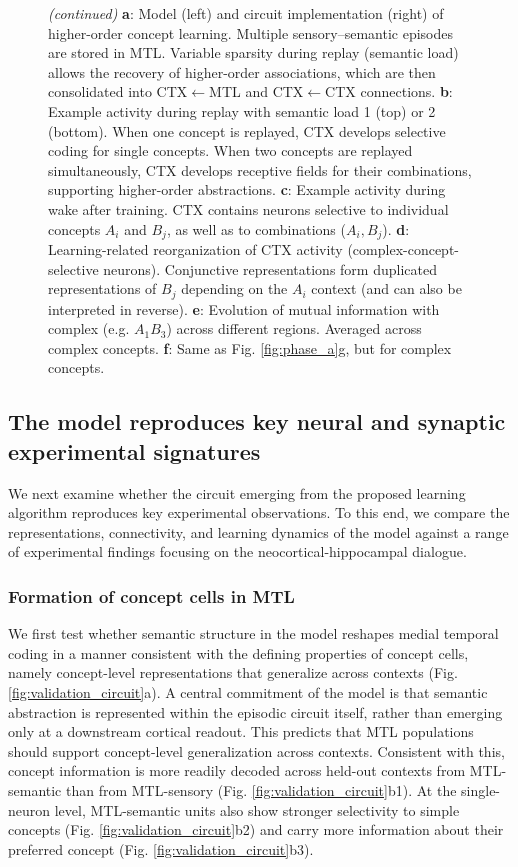 \documentclass{article}
\begin{document}
\begin{figure}[h!]
  \ContinuedFloat
  \captionsetup{list=off} %
  \caption{\textit{(continued)} \textbf{a}: Model (left) and circuit implementation (right) of higher-order concept learning. Multiple sensory--semantic episodes are stored in MTL. Variable sparsity during replay (semantic load) allows the recovery of higher-order associations, which are then consolidated into CTX$\leftarrow$MTL and CTX$\leftarrow$CTX connections. \textbf{b}: Example activity during replay with semantic load 1 (top) or 2 (bottom). When one concept is replayed, CTX develops selective coding for single concepts. When two concepts are replayed simultaneously, CTX develops receptive fields for their combinations, supporting higher-order abstractions.  
\textbf{c}: Example activity during wake after training. CTX contains neurons selective to individual concepts $A_i$ and $B_j$, as well as to combinations ($A_i, B_j$).  
\textbf{d}: Learning-related reorganization of CTX activity (complex-concept-selective neurons). Conjunctive representations form duplicated representations of $B_j$ depending on the $A_i$ context (and can also be interpreted in reverse).
\textbf{e}: Evolution of mutual information with complex (e.g. $A_1B_3$) across different regions. Averaged across  complex concepts. \textbf{f}: Same as Fig. \ref{fig:phase_a}g, but for complex concepts.}
\end{figure}
\subsection*{The model reproduces key neural and synaptic experimental signatures}

We next examine whether the circuit emerging from the proposed learning algorithm reproduces key experimental observations. To this end, we compare the representations, connectivity, and learning dynamics of the model against a range of experimental findings focusing on the neocortical-hippocampal dialogue.
\subsubsection*{Formation of concept cells in MTL}
We first test whether semantic structure in the model reshapes medial temporal coding in a manner consistent with the defining properties of concept cells, namely concept-level representations that generalize across contexts (Fig. \ref{fig:validation_circuit}a). A central commitment of the model is that semantic abstraction is represented within the episodic circuit itself, rather than emerging only at a downstream cortical readout. This predicts that MTL populations should support concept-level generalization across contexts. Consistent with this, concept information is more readily decoded across held-out contexts from MTL-semantic than from MTL-sensory (Fig. \ref{fig:validation_circuit}b1). At the single-neuron level, MTL-semantic units also show stronger selectivity to simple concepts (Fig. \ref{fig:validation_circuit}b2) and carry more information about their preferred concept (Fig. \ref{fig:validation_circuit}b3).
\end{document}
